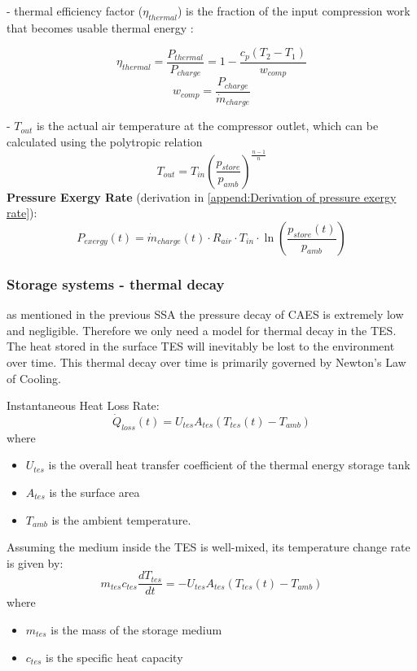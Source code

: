  - thermal efficiency factor ($\eta_{thermal}$) is the fraction of the input compression work that becomes usable thermal energy :

$$ \eta_{thermal} = \frac{P_{thermal}}{P_{charge}} = 1 - \frac{c_p (T_2 - T_1)}{w_{comp}} $$
$$ w_{comp} = \frac{P_{charge}}{\dot{m}_{charge}}  $$

- $T_{out}$ is the actual air temperature at the compressor outlet, which can be calculated using the polytropic relation
$$T_{out} = T_{in} \left(\frac{p_{store}}{p_{amb}}\right)^{\frac{n-1}{n}}$$
\textbf{Pressure Exergy Rate} (derivation in \ref{append:Derivation of pressure exergy rate}):
\begin{equation}
    P_{exergy}(t) = \dot{m}_{charge}(t) \cdot R_{air} \cdot T_{in} \cdot \ln\left(\frac{p_{store}(t)}{p_{amb}}\right)
\end{equation}

\subsubsection{Storage systems - thermal decay}
 as mentioned in the previous SSA the pressure decay of CAES is extremely low and negligible.  Therefore we only need a model for thermal decay in the TES.
The heat stored in the surface TES will inevitably be lost to the environment over time. This thermal decay over time is primarily governed by Newton's Law of Cooling.

Instantaneous Heat Loss Rate:
\begin{equation}
\dot{Q}_{loss}(t)=U_{tes}A_{tes}(T_{tes}(t)-T_{amb})
\end{equation}
where
\begin{itemize}
    \item []$U_{tes}$ is the overall heat transfer coefficient of the thermal energy storage tank
    \item[] $A_{tes}$ is the surface area
    \item[] $T_{amb}$ is the ambient temperature.
\end{itemize}  

Assuming the medium inside the TES is well-mixed, its temperature change rate is given by:
\begin{equation}
m_{tes}c_{tes}\frac{dT_{tes}}{dt}=-U_{tes}A_{tes}(T_{tes}(t)-T_{amb})
\end{equation}
where 
\begin{itemize}
    \item []$m_{tes}$ is the mass of the storage medium
    \item [] $c_{tes}$ is the specific heat capacity
\end{itemize}

